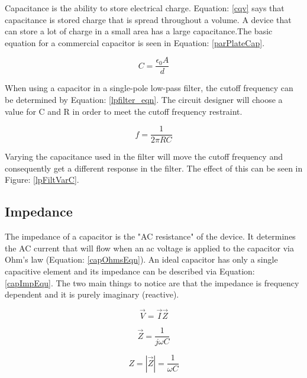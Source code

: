 Capacitance is the ability to store electrical charge. Equation: \eqref{cqv} says that capacitance is stored charge that is spread throughout a volume. A device that can store a lot of charge in a small area has a large capacitance.The basic equation for a commercial capacitor is seen in Equation: \eqref{parPlateCap}.

\begin{equation}
\label{parPlateCap}
C = \frac{\epsilon _0 A}{d}
\end{equation}

When using a capacitor in a single-pole low-pass filter, the cutoff frequency can be determined by Equation: \eqref{lpfilter_eqn}. The circuit designer will choose a value for C and R in order to meet the cutoff frequency restraint.

\begin{equation}
\label{lpfilter_eqn}
f = \frac{1}{2\pi RC}
\end{equation}

Varying the capacitance used in the filter will move the cutoff frequency and consequently get a different response in the filter. The effect of this can be seen in Figure: \ref{lpFiltVarC}.




\subsection{Impedance}

The impedance of a capacitor is the "AC resistance" of the device. It determines the AC current that will flow when an ac voltage is applied to the capacitor via Ohm's law (Equation: \eqref{capOhmsEqn}). An ideal capacitor has only a single capacitive element and its impedance can be described via Equation: \eqref{capImpEqu}. The two main things to notice are that the impedance is frequency dependent and it is purely imaginary (reactive).

\begin{equation}
\label{capOhmsEqn}
\vec{V} = \vec{I} \vec{Z}
\end{equation}

\begin{equation}
\label{capImpEqu}
\vec{Z} = \frac{1}{j\omega C}
\end{equation}

\begin{equation}
\label{capMagEqn}
Z = |\vec{Z}| = \frac{1}{\omega C}
\end{equation}

